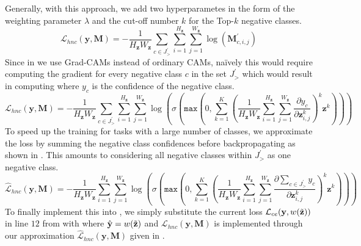 Generally, with this approach, we add two hyperparametes in the form of the weighting parameter $\lambda$ and the cut-off number $k$ for the Top-$k$ negative classes.
\begin{equation}
\label{eq:hnc-kl-simple}
    \mathcal{L}_{hnc}(\mathbf{y}, \boldsymbol{M})= -\frac{1}{H_\mathbf{z} W_\mathbf{z}} \sum_{c \in J^{\prime}_>} \sum_{i=1}^{H_\mathbf{z}} \sum_{j=1}^{W_\mathbf{z}} \log \left(\boldsymbol{M}_{c, i, j}^{\prime}\right)
\end{equation}
Since in \scam we use Grad-CAMs instead of ordinary CAMs, na\"{i}vely this would require computing the gradient for every negative class $c$ in the set $J^\prime_>$ which would result in computing  where $y_c$ is the confidence of the negative class. 
\begin{equation}
\label{eq:hnc-kl-grad-cam}
    \mathcal{L}_{hnc}(\mathbf{y}, \boldsymbol{M})= -\frac{1}{H_\mathbf{z} W_\mathbf{z}} \sum_{c \in J^{\prime}_>} \sum_{i=1}^{H_\mathbf{z}} \sum_{j=1}^{W_\mathbf{z}} \log \left( \sigma \left(\mathtt{max}\left(0,\sum_{k=1}^K\left(\frac{1}{H_\mathbf{z}W_\mathbf{z}} \sum_{i=1}^{H_\mathbf{z}} \sum_{j=1}^{W_\mathbf{z}} \frac{\partial y_c}{\partial \mathbf{z}_{i,j}^k}\right)^k \mathbf{z}^k\right)\right)\right)
\end{equation}
To speed up the training for tasks with a large number of classes, we approximate the loss by summing the negative class confidences before backpropagating as shown in . This amounts to considering all negative classes within $J^\prime_>$ as one negative class. 
\begin{equation}
\label{eq:hnc-kl-grad-cam-approx}
    \widehat{\mathcal{L}}_{hnc}(\mathbf{y}, \boldsymbol{M})= -\frac{1}{H_\mathbf{z} W_\mathbf{z}} \sum_{i=1}^{H_\mathbf{z}} \sum_{j=1}^{W_\mathbf{z}} \log \left( \sigma \left(\mathtt{max}\left(0,\sum_{k=1}^K\left(\frac{1}{H_\mathbf{z}W_\mathbf{z}} \sum_{i=1}^{H_\mathbf{z}} \sum_{j=1}^{W_\mathbf{z}} \frac{\partial \sum_{c \in J^{\prime}_>} y_c}{\partial \mathbf{z}_{i,j}^k}\right)^k \mathbf{z}^k\right)\right)\right)
\end{equation}
To finally implement this into \scam, we simply substitute the current loss $\mathcal{L}_{ce}(\mathbf{y}, w(\Tilde{\mathbf{z}}))$ in line $12$ from  with  where $\hat{\mathbf{y}} = w(\Tilde{\mathbf{z}})$ and $\mathcal{L}_{hnc}(\mathbf{y}, \boldsymbol{M})$ is implemented through our approximation $\widehat{\mathcal{L}}_{hnc}(\mathbf{y}, \boldsymbol{M})$ given in . 

